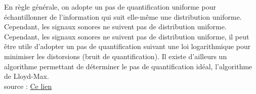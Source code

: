 En règle générale, on adopte un pas de quantification uniforme pour échantillonner de l'information qui suit elle-même une distribution uniforme. Cependant, les signaux sonores ne suivent pas de distribution uniforme. Cependant, les signaux sonores ne suivent pas de distribution uniforme, il peut être utile d'adopter un pas de quantification suivant une loi logarithmique pour minimiser les distorsions (bruit de quantification). Il existe d'ailleurs un algorithme permettant de déterminer le pas de quantification idéal, l'algorithme de Lloyd-Max.
\\
\scriptsize{source :}
\href{https://fr.wikipedia.org/wiki/Quantification_%28signal%29}{Ce lien}

\normalsize